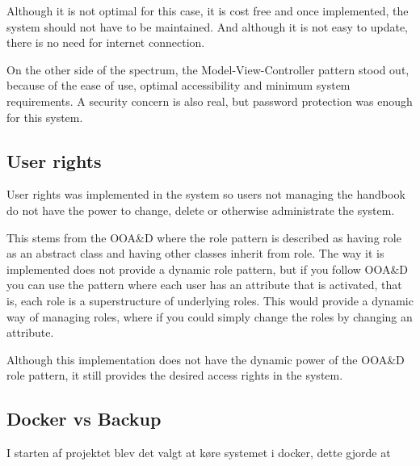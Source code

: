 Although it is not optimal for this case, it is cost free and once implemented, the system should not have to be maintained. And although it is not easy to update, there is no need for internet connection.

On the other side of the spectrum, the Model-View-Controller pattern stood out, because of the ease of use, optimal accessibility and minimum system requirements. A security concern is also real, but password protection was enough for this system.

\subsection{User rights}

User rights was implemented in the system so users not managing the handbook do not have the power to change, delete or otherwise administrate the system.

This stems from the OOA\&D where the role pattern is described as having role as an abstract class and having other classes inherit from role. The way it is implemented does not provide a dynamic role pattern, but if you follow OOA\&D you can use the pattern where each user has an attribute that is activated, that is, each role is a superstructure of underlying roles. This would provide a dynamic way of managing roles, where if you could simply change the roles by changing an attribute.

Although this implementation does not have the dynamic power of the OOA\&D role pattern, it still provides the desired access rights in the system.

\subsection{Docker vs Backup}

I starten af projektet blev det valgt at køre systemet i docker, dette gjorde at  
